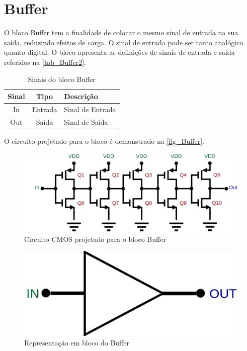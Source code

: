 \renewcommand{\NomeBloco}{Buffer}
\renewcommand{\NomePTab}{tab_\NomeBloco}
\renewcommand{\NomeSTab}{tab_\NomeBloco2}
\renewcommand{\NomePFig}{fig_\NomeBloco}
\renewcommand{\NomeSFig}{fig_\NomeBloco2}
\renewcommand{\NomeTTab}{tab_\NomeBloco3}

\section{Buffer}
\label{buffer}

O bloco \NomeBloco{} tem a finalidade de colocar o mesmo sinal de entrada na sua sa\'ida, reduzindo efeitos de carga. O sinal de entrada pode ser tanto anal\'ogico quanto digital. O bloco apresenta as definições de sinais de entrada e sa\'ida referidos na \autoref{\NomeSTab}.

\begin{table}[htb]
\caption{Sinais do bloco \NomeBloco}
\label{\NomeSTab}
\centering
\begin{tabular}{ccl}

    \toprule
    Sinal & Tipo    & Descrição        \\
    \midrule \midrule
    In    & Entrada & Sinal de Entrada \\
    \midrule
    Out   & Saída   & Sinal de Sa\'ida   \\
    \bottomrule
\end{tabular}
\end{table}

O circuito projetado para o bloco \'e demonstrado na \autoref{\NomePFig}.

\begin{figure}[htb]
 \centering
    \caption{\label{\NomePFig}Circuito CMOS projetado para o bloco \NomeBloco}
    \includegraphics[scale=0.3]{Circuitos/Buffer.png}
\end{figure}

\begin{figure}[htb]
 \centering
    \centering
    \caption{Representação em bloco do \NomeBloco} \label{\NomeSFig2}
    \includegraphics[scale=0.3]{Circuitos/Buffer_block.png}
\end{figure}


